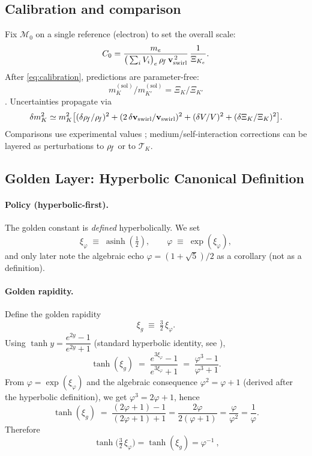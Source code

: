 \subsection{Calibration and comparison}

Fix \(\mathcal{M}_0\) on a single reference (electron) to set the overall scale:
\begin{equation}
    C_0
    = \frac{m_e}{\big(\sum_i V_i\big)_e \,\rhof \,\vswirl^{\,2}}\,
    \frac{1}{\Xi_{K_e}} .
    \label{eq:calibration}
\end{equation}
After \eqref{eq:calibration}, predictions are parameter-free:
\[
m_K^{(\mathrm{sol})}/m_{K'}^{(\mathrm{sol})}
= \Xi_K/\Xi_{K'}
\].
Uncertainties propagate via
\begin{equation}
\delta m_K^2 \simeq m_K^2\big[
    (\delta\rhof/\rhof)^2
    + (2\,\delta\vswirl/\vswirl)^2
    + (\delta V/V)^2
    + (\delta\Xi_K/\Xi_K)^2
    \big].
\end{equation}
Comparisons use experimental values \cite{PDG2024}; medium/self-interaction corrections can be layered as perturbations to \(\rho_{\!f}\) or to \(\mathcal{T}_K\).


\subsection{Golden Layer: Hyperbolic Canonical Definition}
\label{sec:golden_layer}

\providecommand{\rc}{r_c}
\providecommand{\vswirl}{\mathbf{v}_{\mathrm{swirl}}}

\paragraph*{Policy (hyperbolic-first).}
The golden constant is \emph{defined} hyperbolically. We set
\[
    \xi_\varphi \;\equiv\; \operatorname{asinh}\!\left(\tfrac{1}{2}\right),
    \qquad
    \varphi \;\equiv\; \exp(\xi_\varphi),
\]
and only later note the algebraic echo \(\varphi=(1+\sqrt5)/2\) as a corollary (not as a definition).

\paragraph*{Golden rapidity.}
Define the golden rapidity
\[
    \xi_g \;\equiv\; \tfrac{3}{2}\,\xi_\varphi.
\]
Using \(\tanh y=\dfrac{e^{2y}-1}{e^{2y}+1}\) (standard hyperbolic identity, see \cite{NISTDLMF}),
\[
    \tanh(\xi_g) \;=\; \frac{e^{3\xi_\varphi}-1}{e^{3\xi_\varphi}+1}
    \;=\; \frac{\varphi^3-1}{\varphi^3+1}.
\]
From \(\varphi=\exp(\xi_\varphi)\) and the algebraic consequence \(\varphi^2=\varphi+1\) (derived after the hyperbolic definition), we get \(\varphi^3=2\varphi+1\), hence
\[
    \tanh(\xi_g) \;=\; \frac{(2\varphi+1)-1}{(2\varphi+1)+1}
    =\frac{2\varphi}{2(\varphi+1)}=\frac{\varphi}{\varphi^2}=\frac{1}{\varphi}.
\]
Therefore
\[
    \boxed{\ \tanh\!\big(\tfrac{3}{2}\,\xi_\varphi\big)=\tanh(\xi_g)=\varphi^{-1}\ },
\]

